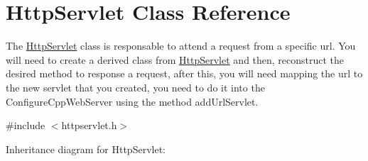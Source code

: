 \hypertarget{class_http_servlet}{}\section{Http\+Servlet Class Reference}
\label{class_http_servlet}


The \mbox{\hyperlink{class_http_servlet}{Http\+Servlet}} class is responsable to attend a request from a specific url. You will need to create a derived class from \mbox{\hyperlink{class_http_servlet}{Http\+Servlet}} and then, reconstruct the desired method to response a request, after this, you will need mapping the url to the new servlet that you created, you need to do it into the Configure\+Cpp\+Web\+Server using the method add\+Url\+Servlet.  




{\ttfamily \#include $<$httpservlet.\+h$>$}



Inheritance diagram for Http\+Servlet\+:
